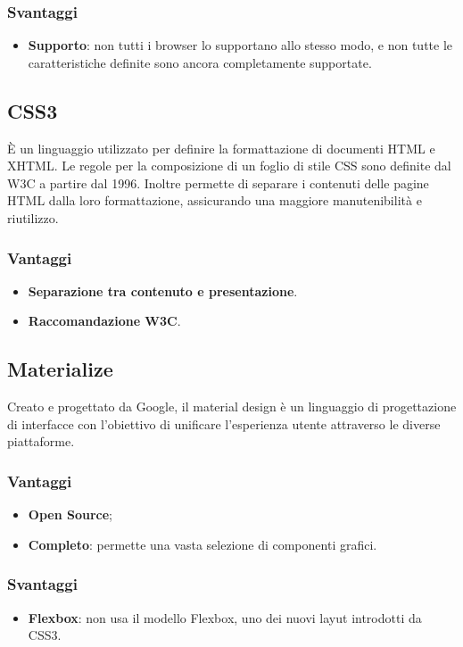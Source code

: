 \subsubsection{Svantaggi}
\begin{itemize}
\item \textbf{Supporto}: non tutti i browser lo supportano allo stesso modo, e non tutte le caratteristiche definite sono ancora completamente supportate.
\end{itemize}
\subsection{CSS3}
\`E un linguaggio utilizzato per definire la formattazione di documenti HTML e XHTML. Le regole per la composizione di un foglio di stile CSS sono definite dal W3C a partire dal 1996. Inoltre permette di separare i contenuti delle pagine HTML dalla loro formattazione, assicurando una maggiore manutenibilit\`a e riutilizzo.
\subsubsection{Vantaggi}
\begin{itemize}
\item \textbf{Separazione tra contenuto e presentazione}.
\item \textbf{Raccomandazione W3C}.
\end{itemize}
\subsection{Materialize}
Creato e progettato da Google, il material design è un linguaggio di progettazione di interfacce con l'obiettivo di unificare l'esperienza utente attraverso le diverse piattaforme.
\subsubsection{Vantaggi}
\begin{itemize}
\item \textbf{Open Source};
\item \textbf{Completo}: permette una vasta selezione di componenti grafici.
\end{itemize}
\subsubsection{Svantaggi}
\begin{itemize}
\item \textbf{Flexbox}: non usa il modello Flexbox, uno dei nuovi layut introdotti da CSS3.
\end{itemize}
